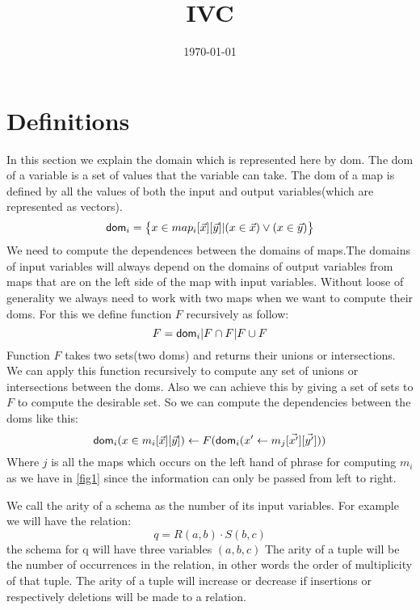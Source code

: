 \documentclass[12pt]{article}
\begin{document}
\title{IVC}
\author{}
\date{\today}
\maketitle
\newcommand{\dom}{\textsf{dom}}

\section{Definitions}
In this section we explain the domain which is represented here by \dom. The \dom{}   of a variable is a set of values that the variable can take. The \dom{} of a map is defined by all the values of both the input and output variables(which are represented as vectors). 
\begin{equation*}
\text{\dom}_{i}=  \big\{x\in map_{i}[\vec{x}][\vec{y}]| (x\in \vec{x})\lor(x\in \vec{y})\big\}
\end{equation*}
We need to compute the dependences between the domains of maps.The domains of input variables will always depend on the domains of output variables from maps that are on the left side of the map with input variables. Without loose of generality  we always need to work with two maps when we want to compute their \dom s. For this we define function $F$ recursively as follow:
\begin{equation*}
F=\text{\dom}_{i}|F\cap F|F\cup F
\end{equation*}
Function $F$ takes two sets(two \dom s) and returns their unions or intersections. We can apply this function recursively to compute any set of unions or intersections between the \dom s. Also we can achieve this by giving a set of sets to $F$ to compute the desirable set.
So we can compute the dependencies between the \dom s like this:
\begin{equation*}
\text{\dom}_{i}(x\in m_{i}[\vec{x}][\vec{y}])\gets F(\text{\dom}_{i}(x'\gets m_{j}[\vec{x'}][\vec{y'}]))
\end{equation*}
Where $j$ is all the maps which occurs on the left hand of phrase for computing $m_{i}$ as we have in \ref{fig1} since the information can only be passed from left to right.\\ 
\par
We call the arity of a schema as the number of its input variables. 
For example we will have the relation: $$q=R(a,b)\cdot S(b,c)$$ the schema for q will have three variables $(a,b,c)$ The arity of a tuple will be the number of occurrences in the relation, in other words the order of multiplicity of that tuple. The arity of a tuple will increase or decrease if insertions or respectively deletions will be made to a relation.
\end{document}
